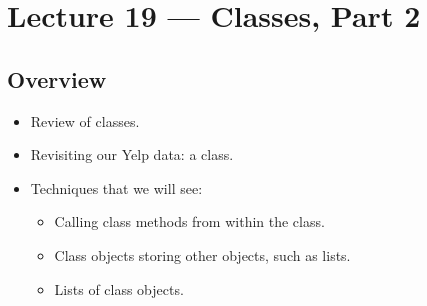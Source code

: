 \documentclass[letterpaper,10pt,english]{sphinxmanual}
\begin{document}
\chapter{Lecture 19 — Classes, Part 2}
\label{\detokenize{lecture_notes/lec19_classes2:lecture-19-classes-part-2}}\label{\detokenize{lecture_notes/lec19_classes2::doc}}

\section{Overview}
\label{\detokenize{lecture_notes/lec19_classes2:overview}}\begin{itemize}
\item {} 
Review of classes.

\item {} 
Revisiting our Yelp data:  a  class.

\item {} 
Techniques that we will see:
\begin{itemize}
\item {} 
Calling class methods from within the class.

\item {} 
Class objects storing other objects, such as lists.

\item {} 
Lists of class objects.

\end{itemize}

\end{itemize}
\end{document}
